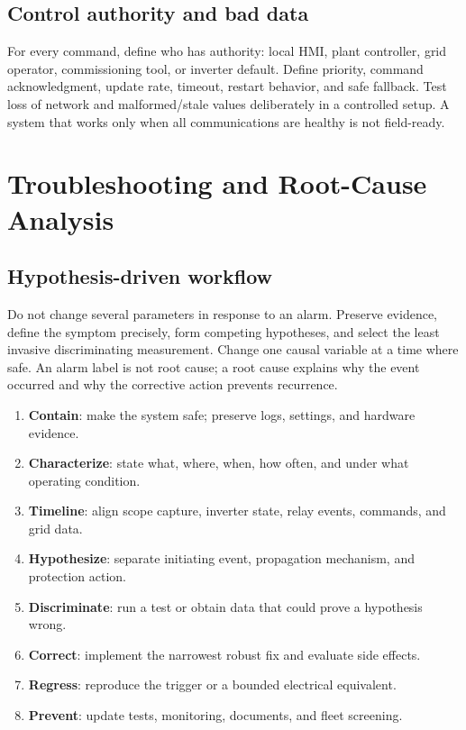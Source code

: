 \documentclass[11pt]{article}
\begin{document}
\subsection{Control authority and bad data}
For every command, define who has authority: local HMI, plant controller, grid
operator, commissioning tool, or inverter default. Define priority, command
acknowledgment, update rate, timeout, restart behavior, and safe fallback. Test
loss of network and malformed/stale values deliberately in a controlled setup.
A system that works only when all communications are healthy is not field-ready.

\section{Troubleshooting and Root-Cause Analysis}

\subsection{Hypothesis-driven workflow}
Do not change several parameters in response to an alarm. Preserve evidence,
define the symptom precisely, form competing hypotheses, and select the least
invasive discriminating measurement. Change one causal variable at a time where
safe. An alarm label is not root cause; a root cause explains why the event
occurred and why the corrective action prevents recurrence.

\begin{enumerate}
\item \textbf{Contain}: make the system safe; preserve logs, settings, and hardware evidence.
\item \textbf{Characterize}: state what, where, when, how often, and under what operating condition.
\item \textbf{Timeline}: align scope capture, inverter state, relay events, commands, and grid data.
\item \textbf{Hypothesize}: separate initiating event, propagation mechanism, and protection action.
\item \textbf{Discriminate}: run a test or obtain data that could prove a hypothesis wrong.
\item \textbf{Correct}: implement the narrowest robust fix and evaluate side effects.
\item \textbf{Regress}: reproduce the trigger or a bounded electrical equivalent.
\item \textbf{Prevent}: update tests, monitoring, documents, and fleet screening.
\end{enumerate}
\end{document}

